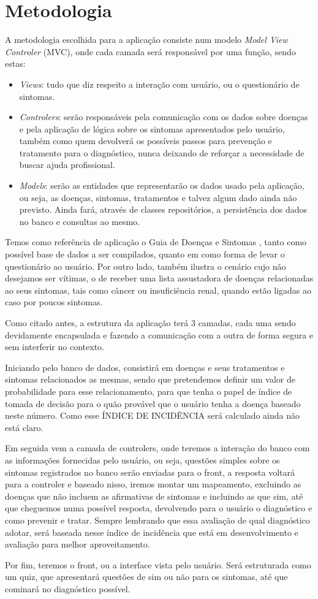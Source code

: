 \section{Metodologia}

A metodologia escolhida para a aplicação consiste num modelo \emph{Model View Controler} (MVC), onde cada camada será responsável por uma função, sendo estas:
\begin{itemize}
    \item \emph{Views}: tudo que diz respeito a interação com usuário, ou o questionário de sintomas.
    \item \emph{Controlers}: serão responsáveis pela comunicação com os dados sobre doenças e pela aplicação de lógica sobre os sintomas apresentados pelo usuário, também como quem devolverá os possíveis passos para prevenção e tratamento para o diagnóstico, nunca deixando de reforçar a necessidade de buscar ajuda profissional.
    \item \emph{Models}: serão as entidades que representarão os dados usado pela aplicação, ou seja, as doenças, sintomas, tratamentos e talvez algum dado ainda não previsto. Ainda fará, através de classes repositórios, a persistência dos dados no banco e consultas ao mesmo.
\end{itemize}


Temos como referência de aplicação o Guia de Doenças e Sintomas \cite{alberteinstein}, tanto como possível base de dados a ser compilados, quanto em como forma de levar o questionário ao usuário.
Por outro lado, também ilustra o cenário cujo não desejamos ser vítimas, o de receber uma lista assustadora de doenças relacionadas ao seus sintomas, tais como câncer ou insuficiência renal, quando estão ligadas ao caso por poucos sintomas.


Como citado antes, a estrutura da aplicação terá 3 camadas, cada uma sendo devidamente encapsulada e fazendo a comunicação com a outra de forma segura e sem interferir no contexto.

Iniciando pelo banco de dados, consistirá em  doenças e seus tratamentos e sintomas relacionados as mesmas, sendo que pretendemos definir um valor de probabilidade para esse relacionamento, para que tenha o papel de índice de tomada de decisão para o quão provável   que o usuário tenha a doença baseado neste número. Como esse ÍNDICE DE INCIDÊNCIA será calculado ainda não está claro.

Em seguida vem a camada de controlers, onde teremos a interação do banco com as informações fornecidas pelo usuário, ou seja, questões simples sobre os sintomas registrados no banco serão enviadas para o front, a resposta voltará para a controler e baseado nisso, iremos montar um mapeamento, excluindo as doenças que não incluem as afirmativas de sintomas e incluindo as que sim, até que cheguemos numa possível resposta, devolvendo para o usuário o diagnóstico e como prevenir e tratar.
Sempre lembrando que essa avaliação de qual diagnóstico adotar, será baseada nesse índice de incidência que está em desenvolvimento e avaliação para melhor aproveitamento.


Por fim, teremos o front, ou a interface vista pelo usuário. Será estruturada como um quiz, que apresentará questões de sim ou não para os sintomas, até que cominará no diagnóstico possível.


